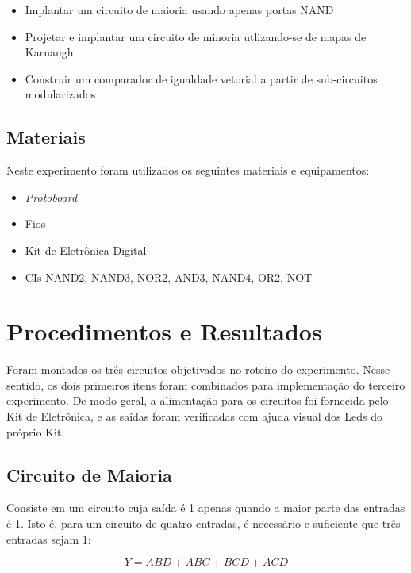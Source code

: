 \documentclass[12pt]{article}
\begin{document}
\begin{itemize}
    \item Implantar um circuito de maioria usando apenas portas NAND
    \item Projetar e implantar um circuito de minoria utlizando-se de mapas de Karnaugh
    \item Construir um comparador de igualdade vetorial a partir de sub-circuitos modularizados
\end{itemize}

\subsection{Materiais} 
\label{sec:Materiais}
Neste experimento foram utilizados os seguintes materiais e equipamentos:
\begin{itemize}

    \item \textit{Protoboard}
    
    \item Fios

    \item Kit de Eletrônica Digital
    
    \item CIs NAND2, NAND3, NOR2, AND3, NAND4, OR2, NOT
\end{itemize}

\section{Procedimentos e Resultados}
\label{sec:Procedimentos}

Foram montados os três circuitos objetivados no roteiro do experimento.
Nesse sentido, os dois primeiros itens foram combinados para implementação
do terceiro experimento. De modo geral, a alimentação para os circuitos foi
fornecida pelo Kit de Eletrônica, e as saídas foram verificadas com ajuda
visual dos Leds do próprio Kit.

\subsection{Circuito de Maioria}
\label{sec:Mux}

Consiste em um circuito cuja saída
é 1 apenas quando a maior parte das
entradas é 1. Isto é, para um circuito
de quatro entradas, é necessário e suficiente
que três entradas sejam 1:

\begin{equation}
    Y = ABD + ABC + BCD + ACD
\end{equation}
\end{document}
